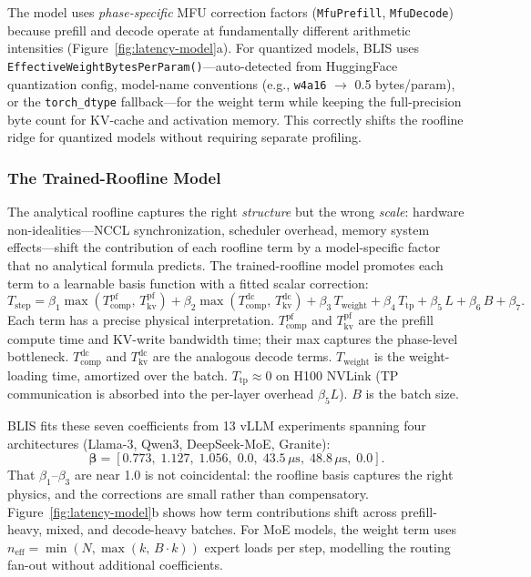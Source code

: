\documentclass[11pt]{article}
\theoremstyle{plain} %
\theoremstyle{definition} %
\theoremstyle{remark} %
\newcommand{\code}[1]{\texttt{#1}}
\numberwithin{equation}{section}
\begin{document}
The model uses \emph{phase-specific} MFU correction factors (\code{MfuPrefill},
\code{MfuDecode}) because prefill and decode operate at fundamentally different
arithmetic intensities (Figure~\ref{fig:latency-model}a).
For quantized models, BLIS uses \code{EffectiveWeightBytesPerParam()}---auto-detected
from HuggingFace quantization config, model-name conventions (e.g., \code{w4a16}
$\rightarrow$ 0.5 bytes/param), or the \code{torch\_dtype} fallback---for the weight
term while keeping the full-precision byte count for KV-cache and activation memory.
This correctly shifts the roofline ridge for quantized models without requiring
separate profiling.

\subsubsection{The Trained-Roofline Model}
\label{subsubsec:trained-roofline}

The analytical roofline captures the right \emph{structure} but the wrong
\emph{scale}: hardware non-idealities---NCCL synchronization, scheduler overhead,
memory system effects---shift the contribution of each roofline term by a
model-specific factor that no analytical formula predicts.
The trained-roofline model promotes each term to a learnable basis function with a
fitted scalar correction:
\begin{equation}
\boxed{
  T_\text{step} =
    \beta_1\max(T^\text{pf}_\text{comp},\,T^\text{pf}_\text{kv})
  + \beta_2\max(T^\text{dc}_\text{comp},\,T^\text{dc}_\text{kv})
  + \beta_3\,T_\text{weight}
  + \beta_4\,T_\text{tp}
  + \beta_5\,L
  + \beta_6\,B
  + \beta_7.
}
  \label{eq:trained-roofline}
\end{equation}
Each term has a precise physical interpretation.
$T^\text{pf}_\text{comp}$ and $T^\text{pf}_\text{kv}$ are the prefill
compute time and KV-write bandwidth time; their max captures the phase-level
bottleneck.
$T^\text{dc}_\text{comp}$ and $T^\text{dc}_\text{kv}$ are the analogous
decode terms.
$T_\text{weight}$ is the weight-loading time, amortized over the batch.
$T_\text{tp} \approx 0$ on H100 NVLink (TP communication is absorbed into the
per-layer overhead $\beta_5 L$).
$B$ is the batch size.

BLIS fits these seven coefficients from 13 vLLM experiments spanning four
architectures (Llama-3, Qwen3, DeepSeek-MoE, Granite):
\[
  \bm{\beta} = [0.773,\;1.127,\;1.056,\;0.0,\;43.5\,\mu\text{s},\;48.8\,\mu\text{s},\;0.0].
\]
That $\beta_1$--$\beta_3$ are near 1.0 is not coincidental: the roofline basis
captures the right physics, and the corrections are small rather than compensatory.
Figure~\ref{fig:latency-model}b shows how term contributions shift across
prefill-heavy, mixed, and decode-heavy batches.
For MoE models, the weight term uses $n_\text{eff} = \min(N,\max(k,\,B{\cdot}k))$
expert loads per step, modelling the routing fan-out without additional coefficients.
\end{document}
